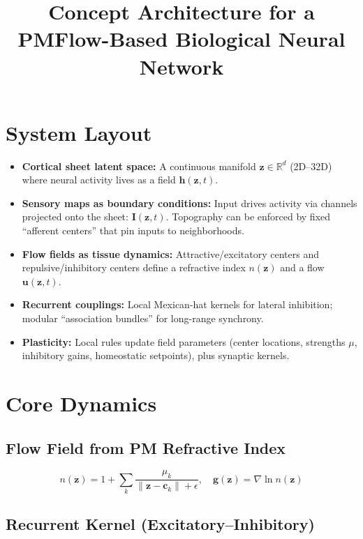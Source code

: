 \documentclass[12pt]{article}
\title{Concept Architecture for a PMFlow-Based Biological Neural Network}
\author{}
\date{}
\begin{document}
\maketitle

\section{System Layout}
\begin{itemize}
    \item \textbf{Cortical sheet latent space:} A continuous manifold $\mathbf{z} \in \mathbb{R}^d$ (2D--32D) where neural activity lives as a field $\mathbf{h}(\mathbf{z}, t)$.
    \item \textbf{Sensory maps as boundary conditions:} Input drives activity via channels projected onto the sheet: $\mathbf{I}(\mathbf{z}, t)$. Topography can be enforced by fixed ``afferent centers'' that pin inputs to neighborhoods.
    \item \textbf{Flow fields as tissue dynamics:} Attractive/excitatory centers and repulsive/inhibitory centers define a refractive index $n(\mathbf{z})$ and a flow $\mathbf{u}(\mathbf{z}, t)$.
    \item \textbf{Recurrent couplings:} Local Mexican-hat kernels for lateral inhibition; modular ``association bundles'' for long-range synchrony.
    \item \textbf{Plasticity:} Local rules update field parameters (center locations, strengths $\mu$, inhibitory gains, homeostatic setpoints), plus synaptic kernels.
\end{itemize}

\section{Core Dynamics}

\subsection{Flow Field from PM Refractive Index}


\[
n(\mathbf{z}) = 1 + \sum_{k}\frac{\mu_k}{\|\mathbf{z}-\mathbf{c}_k\| + \epsilon}, \quad
\mathbf{g}(\mathbf{z}) = \nabla \ln n(\mathbf{z})
\]



\subsection{Recurrent Kernel (Excitatory--Inhibitory)}
\end{document}
